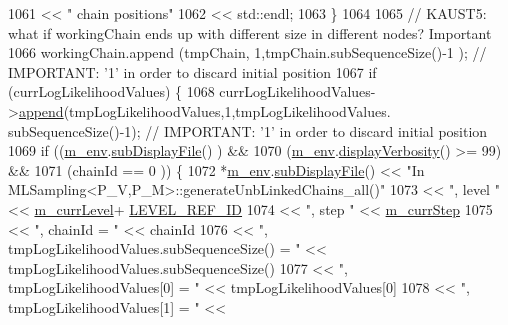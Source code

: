 \begin{DoxyCode}
1061                                 << \textcolor{stringliteral}{" chain positions"}
1062                                 << std::endl;
1063       \}
1064 
1065       \textcolor{comment}{// KAUST5: what if workingChain ends up with different size in different nodes? Important}
1066       workingChain.append              (tmpChain,              1,tmpChain.subSequenceSize()-1              
      ); \textcolor{comment}{// IMPORTANT: '1' in order to discard initial position}
1067       \textcolor{keywordflow}{if} (currLogLikelihoodValues) \{
1068         currLogLikelihoodValues->\hyperlink{class_q_u_e_s_o_1_1_scalar_sequence_a75cdd556cc417e35a6b9f7aff86896ae}{append}(tmpLogLikelihoodValues,1,tmpLogLikelihoodValues.
      subSequenceSize()-1); \textcolor{comment}{// IMPORTANT: '1' in order to discard initial position}
1069         \textcolor{keywordflow}{if} ((\hyperlink{class_q_u_e_s_o_1_1_m_l_sampling_a13f1ca4fe9f94822fe572a743eaced1d}{m\_env}.\hyperlink{class_q_u_e_s_o_1_1_base_environment_a8a0064746ae8dddfece4229b9ad374d6}{subDisplayFile}()        ) &&
1070             (\hyperlink{class_q_u_e_s_o_1_1_m_l_sampling_a13f1ca4fe9f94822fe572a743eaced1d}{m\_env}.\hyperlink{class_q_u_e_s_o_1_1_base_environment_a1fe5f244fc0316a0ab3e37463f108b96}{displayVerbosity}() >= 99) &&
1071             (chainId == 0                  )) \{
1072           *\hyperlink{class_q_u_e_s_o_1_1_m_l_sampling_a13f1ca4fe9f94822fe572a743eaced1d}{m\_env}.\hyperlink{class_q_u_e_s_o_1_1_base_environment_a8a0064746ae8dddfece4229b9ad374d6}{subDisplayFile}() << \textcolor{stringliteral}{"In
       MLSampling<P\_V,P\_M>::generateUnbLinkedChains\_all()"}
1073                                   << \textcolor{stringliteral}{", level "}     << \hyperlink{class_q_u_e_s_o_1_1_m_l_sampling_af9416874c856e50f3b35270e801f17e4}{m\_currLevel}+
      \hyperlink{_m_l_sampling_level_options_8h_a68d15eaf394d210effcf584b938206d3}{LEVEL\_REF\_ID}
1074                                   << \textcolor{stringliteral}{", step "}      << \hyperlink{class_q_u_e_s_o_1_1_m_l_sampling_a1b1f8ccb4823bdfa26ec652f0807c63e}{m\_currStep}
1075                                   << \textcolor{stringliteral}{", chainId = "} << chainId
1076                                   << \textcolor{stringliteral}{", tmpLogLikelihoodValues.subSequenceSize() = "} << 
      tmpLogLikelihoodValues.subSequenceSize()
1077                                   << \textcolor{stringliteral}{", tmpLogLikelihoodValues[0] = "}                << 
      tmpLogLikelihoodValues[0]
1078                                   << \textcolor{stringliteral}{", tmpLogLikelihoodValues[1] = "}                << 

\end{DoxyCode}
